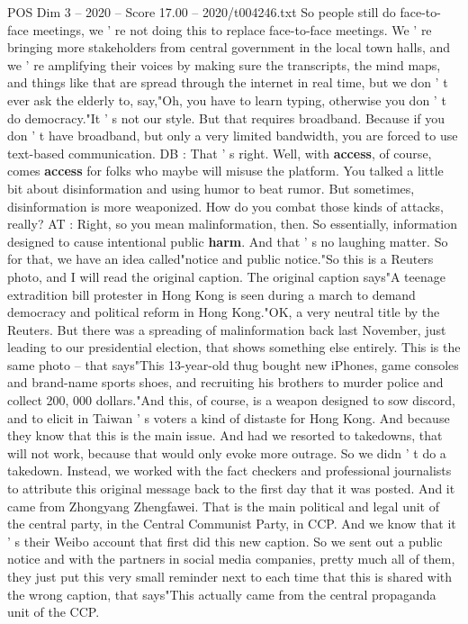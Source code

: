 \begin{textsample}{POS Dim 3 – 2020 – Score 17.00 – 2020/t004246.txt}
So people still do face-to-face meetings, we ' re not doing this to replace face-to-face meetings.
We ' re bringing more stakeholders from central government in the local town halls, and we ' re amplifying their voices by making sure the transcripts, the mind maps, and things like that are spread through the internet in real time, but we don ' t ever ask the elderly to, say,"Oh, you have to learn typing, otherwise you don ' t do democracy."It ' s not our style.
But that requires broadband.
Because if you don ' t have broadband, but only a very limited bandwidth, you are forced to use text-based communication.
DB : That ' s right.
Well, with \textbf{access}, of course, comes \textbf{access} for folks who maybe will misuse the platform.
You talked a little bit about disinformation and using humor to beat rumor.
But sometimes, disinformation is more weaponized.
How do you combat those kinds of attacks, really?
AT : Right, so you mean malinformation, then.
So essentially, information designed to cause intentional public \textbf{harm}.
And that ' s no laughing matter.
So for that, we have an idea called"notice and public notice."So this is a Reuters photo, and I will read the original caption.
The original caption says"A teenage extradition bill protester in Hong Kong is seen during a march to demand democracy and political reform in Hong Kong."OK, a very neutral title by the Reuters.
But there was a spreading of malinformation back last November, just leading to our presidential election, that shows something else entirely.
This is the same photo -- that says"This 13-year-old thug bought new iPhones, game consoles and brand-name sports shoes, and recruiting his brothers to murder police and collect 200, 000 dollars."And this, of course, is a weapon designed to sow discord, and to elicit in Taiwan ' s voters a kind of distaste for Hong Kong.
And because they know that this is the main issue.
And had we resorted to takedowns, that will not work, because that would only evoke more outrage.
So we didn ' t do a takedown.
Instead, we worked with the fact checkers and professional journalists to attribute this original message back to the first day that it was posted.
And it came from Zhongyang Zhengfawei.
That is the main political and legal unit of the central party, in the Central Communist Party, in CCP.
And we know that it ' s their Weibo account that first did this new caption.
So we sent out a public notice and with the partners in social media companies, pretty much all of them, they just put this very small reminder next to each time that this is shared with the wrong caption, that says"This actually came from the central propaganda unit of the CCP.

\end{textsample}
